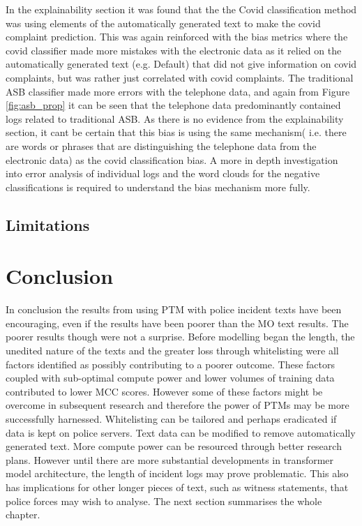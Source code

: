 In the explainability section it was found that the the Covid classification method was using elements of the automatically generated text to make the covid complaint prediction. This was again reinforced with the bias metrics where the covid classifier made more mistakes with the electronic data as it relied on the automatically generated text (e.g. Default) that did not give information on covid complaints, but was rather just correlated with covid complaints.  The traditional ASB classifier made more errors with the telephone data, and again from Figure \ref{fig:asb_prop} it can be seen that the telephone data predominantly contained logs related to traditional ASB. As there is no evidence from the explainability section, it cant be certain that this bias is using the same mechanism( i.e. there are words or phrases that are distinguishing the telephone data from the electronic data)  as the covid classification bias. A more in depth investigation into error analysis of individual logs and the word clouds for the negative classifications is required to understand the bias mechanism more fully.


\subsection{Limitations}

\section{Conclusion} In conclusion the results from using PTM with police incident texts have been encouraging, even if the results have been poorer than the MO text results. The poorer results though were not a surprise. Before modelling began the length, the unedited nature of the texts and the greater loss through whitelisting were all factors identified as possibly contributing to a poorer outcome. These factors coupled with sub-optimal compute power and lower volumes of training data contributed to lower MCC scores. However some of these factors might be overcome in subsequent research and therefore the power of PTMs may be more successfully harnessed. Whitelisting can be tailored and perhaps eradicated if data is kept on police servers. Text data can be modified to remove automatically generated text. More compute power can be resourced through better research plans. However until there are more substantial developments in transformer model architecture, the length of incident logs may prove problematic. This also has implications for other longer pieces of text, such as witness statements, that police forces may wish to analyse. The next section summarises the whole chapter.

